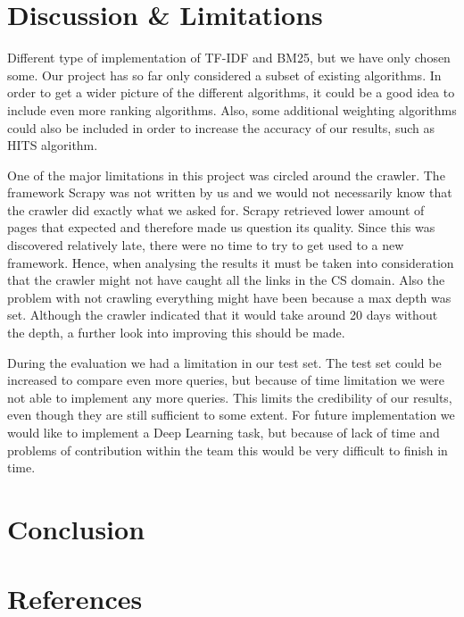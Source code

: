 

\section{Discussion \& Limitations} %
\label{sec:discussion_&_limitations}

Different type of implementation of TF-IDF and BM25, but we have only chosen some. 
Our project has so far only considered a subset of existing algorithms. In order to get a wider picture of the different algorithms, it could be a good idea to include even more ranking algorithms. Also, some additional weighting algorithms could also be included in order to increase the accuracy of our results, such as HITS algorithm.

One of the major limitations in this project was circled around the crawler. The framework Scrapy was not written by us and we would not necessarily know that the crawler did exactly what we asked for. Scrapy retrieved lower amount of pages that expected and therefore made us question its quality. Since this was discovered relatively late, there were no time to try to get used to a new framework. Hence, when analysing the results it must be taken into consideration that the crawler might not have caught all the links in the CS domain. Also the problem with not crawling everything might have been because a max depth was set. Although the crawler indicated that it would take around 20 days without the depth, a further look into improving this should be made.

During the evaluation we had a limitation in our test set. The test set could be increased to compare even more queries, but because of time limitation we were not able to implement any more queries. This limits the credibility of our results, even though they are still sufficient to some extent. For future implementation we would like to implement a Deep Learning task, but because of lack of time and problems of contribution within the team this would be very difficult to finish in time. 


\section{Conclusion} %
\label{sec:conclusion}


\section{References} %
\label{sec:references}



